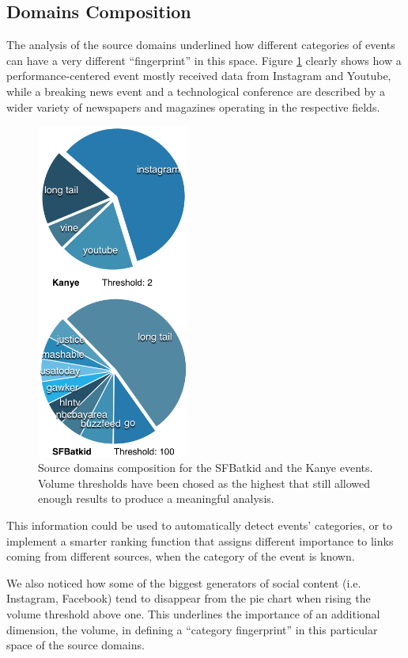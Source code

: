 \documentclass{sig-alternate}
\begin{document}
\subsection{Domains Composition}
\label{sec:domains_composition}
The analysis of the source domains underlined how different categories of events can have a very different ``fingerprint'' in this space. Figure \ref{fig:category_domains} clearly shows how a performance-centered event mostly received data from Instagram and Youtube, while a breaking news event and a technological conference are described by a wider variety of newspapers and magazines operating in the respective fields.
\begin{figure}[htbp]
  \centering
  \includegraphics[width=5cm]{Figures/category_domains.png}
  \caption{Source domains composition for the SFBatkid and the Kanye events. Volume thresholds have been chosed as the highest that still allowed enough results to produce a meaningful analysis.}
  \label{fig:category_domains}
\end{figure}
This information could be used to automatically detect events' categories, or to implement a smarter ranking function that assigns different importance to links coming from different sources, when the category of the event is known.

We also noticed how some of the biggest generators of social content (i.e. Instagram, Facebook) tend to disappear from the pie chart when rising the volume threshold above one. This underlines the importance of an additional dimension, the volume, in defining a ``category fingerprint'' in this particular space of the source domains.
\end{document}
